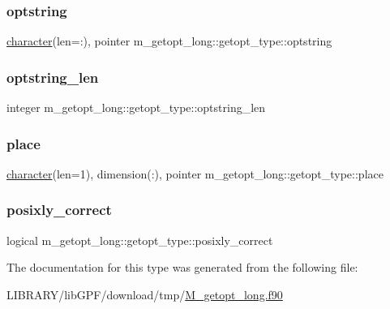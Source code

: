 \subsubsection{\texorpdfstring{optstring}{optstring}}
{\footnotesize\ttfamily \hyperlink{option__stopwatch_83_8txt_abd4b21fbbd175834027b5224bfe97e66}{character}(len=\+:), pointer m\+\_\+getopt\+\_\+long\+::getopt\+\_\+type\+::optstring}

\mbox{\label{structm__getopt__long_1_1getopt__type_a02e7f4b1bfd46652224cf691e097afcf}} 
\subsubsection{\texorpdfstring{optstring\+\_\+len}{optstring\_len}}
{\footnotesize\ttfamily integer m\+\_\+getopt\+\_\+long\+::getopt\+\_\+type\+::optstring\+\_\+len}

\mbox{\label{structm__getopt__long_1_1getopt__type_af6fd8876c9c6d9cc3fd138f82034b6b0}} 
\subsubsection{\texorpdfstring{place}{place}}
{\footnotesize\ttfamily \hyperlink{option__stopwatch_83_8txt_abd4b21fbbd175834027b5224bfe97e66}{character}(len=1), dimension(\+:), pointer m\+\_\+getopt\+\_\+long\+::getopt\+\_\+type\+::place}

\mbox{\label{structm__getopt__long_1_1getopt__type_a8d4f22423343ddddac8ad75e8c5e35a3}} 
\subsubsection{\texorpdfstring{posixly\+\_\+correct}{posixly\_correct}}
{\footnotesize\ttfamily logical m\+\_\+getopt\+\_\+long\+::getopt\+\_\+type\+::posixly\+\_\+correct}



The documentation for this type was generated from the following file\+:\begin{DoxyCompactItemize}
\item 
L\+I\+B\+R\+A\+R\+Y/lib\+G\+P\+F/download/tmp/\hyperlink{M__getopt__long_8f90}{M\+\_\+getopt\+\_\+long.\+f90}\end{DoxyCompactItemize}
